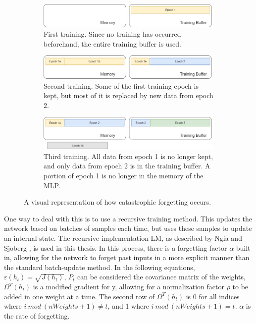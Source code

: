 	\begin{figure}[ht]
	\centering
	\begin{subfigure}{\linewidth}%
			\centering
			\includegraphics[width=\textwidth]{figures/CatastrophicForgettingA}
			\caption{First training. Since no training has occurred beforehand, the entire training buffer is used.}
	\end{subfigure}
	\begin{subfigure}{\linewidth}
		\centering
		\includegraphics[width=\textwidth]{figures/CatastrophicForgettingB}
		\caption{Second training. Some of the first training epoch is kept, but most of it is replaced by new data from epoch 2.}
	\end{subfigure}
	\begin{subfigure}{\linewidth}
	\centering
	\includegraphics[width=\textwidth]{figures/CatastrophicForgettingC}
	\caption{Third training. All data from epoch 1 is no longer kept, and only data from epoch 2 is in the training buffer. A portion of epoch 1 is no longer in the memory of the MLP.}
	\end{subfigure}%
	\caption{A visual representation of how catastrophic forgetting occurs.}
	
	\end{figure}
	\par One way to deal with this is to use a recursive training method. This updates the network based on batches of samples each time, but uses these samples to update an internal state. The recursive implementation LM, as described by Ngia and Sjoberg \cite{placeholderCitation}, is used in this thesis. In this process, there is a forgetting factor $\alpha$ built in, allowing for the network to forget past inputs in a more explicit manner than the standard batch-update method. In the following equations, $\varepsilon(h_t) = \sqrt{J(h_t)}$, $P_t$ can be considered the covariance matrix of the weights, $\Omega^T(h_t)$ is a modified gradient for y, allowing for a normalization factor $\rho$ to be added in one weight at a time. The second row of $\Omega^T(h_t)$ is 0 for all indices where $i\ mod\ (nWeights+1) \neq t$, and 1 where $i\ mod\ (nWeights+1) = t$. $\alpha$ is the rate of forgetting. 
